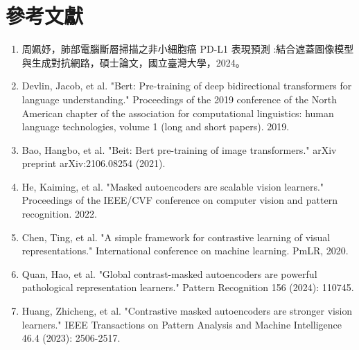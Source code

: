 \documentclass[12pt,a4paper]{article}
\begin{document}
\section{參考文獻}
\begin{enumerate}
    \item 周姵妤，肺部電腦斷層掃描之非小細胞癌 PD-L1 表現預測 :結合遮蓋圖像模型與生成對抗網路，碩士論文，國立臺灣大學，2024。
    \item Devlin, Jacob, et al. "Bert: Pre-training of deep bidirectional transformers for language understanding." Proceedings of the 2019 conference of the North American chapter of the association for computational linguistics: human language technologies, volume 1 (long and short papers). 2019.
    \item Bao, Hangbo, et al. "Beit: Bert pre-training of image transformers." arXiv preprint arXiv:2106.08254 (2021).
    \item He, Kaiming, et al. "Masked autoencoders are scalable vision learners." Proceedings of the IEEE/CVF conference on computer vision and pattern recognition. 2022.
    \item Chen, Ting, et al. "A simple framework for contrastive learning of visual representations." International conference on machine learning. PmLR, 2020.
    \item Quan, Hao, et al. "Global contrast-masked autoencoders are powerful pathological representation learners." Pattern Recognition 156 (2024): 110745.
    \item Huang, Zhicheng, et al. "Contrastive masked autoencoders are stronger vision learners." IEEE Transactions on Pattern Analysis and Machine Intelligence 46.4 (2023): 2506-2517.
\end{enumerate}
\end{document}

